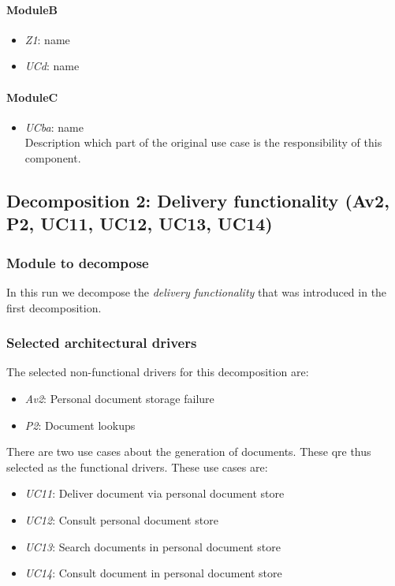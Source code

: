 \documentclass[a4paper,10pt]{article}
\begin{document}
\paragraph{ModuleB}
\begin{itemize}
    \item \emph{Z1}: name
    \item \emph{UCd}: name
\end{itemize}

\paragraph{ModuleC}
\begin{itemize}
    \item \emph{UCba}: name\\Description which part of the original use case is
        the responsibility of this component.
\end{itemize}

\subsection{Decomposition 2: Delivery functionality (Av2, P2, UC11, UC12, UC13, UC14)}
\subsubsection{Module to decompose}
In this run we decompose the \emph{delivery functionality} that was introduced in the first decomposition.

\subsubsection{Selected architectural drivers}
The selected non-functional drivers for this decomposition are:

\begin{itemize}
	\item \emph{Av2}: Personal document storage failure
	\item \emph{P2}: Document lookups
\end{itemize}

There are two use cases about the generation of documents. These qre thus selected as the functional drivers. These use cases are:

\begin{itemize}
	\item \emph{UC11}: Deliver document via personal document store
	\item \emph{UC12}: Consult personal document store
	\item \emph{UC13}: Search documents in personal document store
	\item \emph{UC14}: Consult document in personal document store
\end{itemize}
\end{document}
